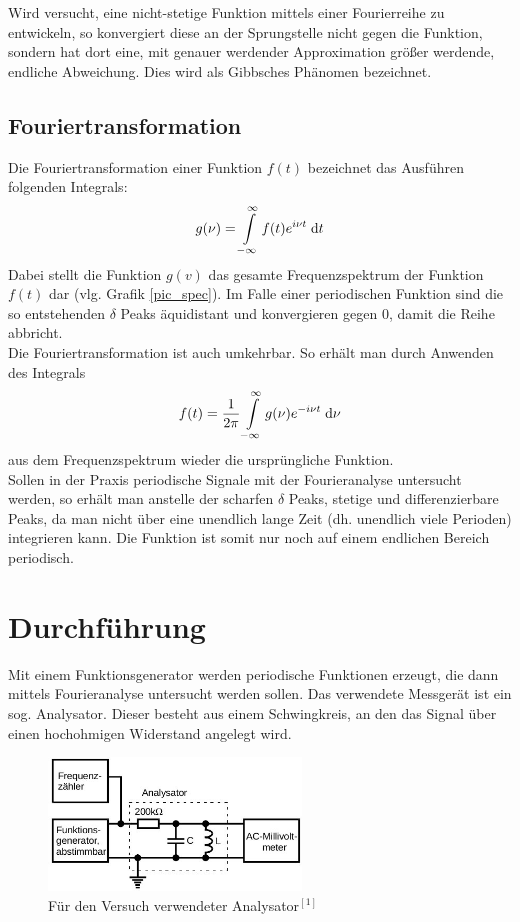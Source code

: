 Wird versucht, eine nicht-stetige Funktion mittels einer Fourierreihe zu entwickeln, so konvergiert diese an der Sprungstelle nicht gegen die Funktion, sondern hat dort eine, mit genauer werdender Approximation größer werdende, endliche Abweichung. Dies wird als Gibbsches Phänomen bezeichnet.

\subsection{Fouriertransformation}
Die Fouriertransformation einer Funktion $f(t)$ bezeichnet das Ausführen folgenden Integrals:
\begin{align}
g(\nu) = \int \limits _{-\infty}^\infty f(t) e^{i\nu t} \; \mathrm{d} t
\label{eq_ftrafo}
\end{align}
Dabei stellt die Funktion $g(v)$ das gesamte Frequenzspektrum der Funktion $f(t)$ dar (vlg. Grafik \ref{pic_spec}). Im Falle einer periodischen Funktion sind die so entstehenden $\delta$ Peaks äquidistant und konvergieren gegen 0, damit die Reihe abbricht.\\

Die Fouriertransformation ist auch umkehrbar. So erhält man durch Anwenden des Integrals
\begin{align}
f(t) = \frac{1}{2\pi} \int \limits ^\infty _{-\infty} g(\nu) e^{-i\nu t} \; \mathrm{d} \nu
\label{eq-ruecktrafo}
\end{align}
aus dem Frequenzspektrum wieder die ursprüngliche Funktion.\\

Sollen in der Praxis periodische Signale mit der Fourieranalyse untersucht werden, so erhält man anstelle der scharfen $\delta$ Peaks, stetige und differenzierbare Peaks, da man nicht über eine unendlich lange Zeit (dh. unendlich viele Perioden) integrieren kann. Die Funktion ist somit nur noch auf einem endlichen Bereich periodisch. 

\section{Durchführung}
Mit einem Funktionsgenerator werden periodische Funktionen erzeugt, die dann mittels Fourieranalyse untersucht werden sollen. Das verwendete Messgerät ist ein sog. Analysator. Dieser besteht aus einem Schwingkreis, an den das Signal über einen hochohmigen Widerstand angelegt wird. 
\begin{figure}[htbp]
\includegraphics[width=0.6\textwidth]{pics/analysator.jpeg}
\caption{Für den Versuch verwendeter Analysator$^{[1]}$}
\end{figure}


